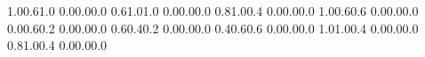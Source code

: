 \documentclass[a5paper,9pt]{scrreprt}
\begin{document}
\thispagestyle{empty}

\setslotsize{4.44cm}{0.203cm}
\settextframe{0.8mm}

\seteventcornerradius{0pt}


   {1.0}{0.6}{1.0}   {0.0}{0.0}{0.0}
  {0.6}{1.0}{1.0}   {0.0}{0.0}{0.0}
      {0.8}{1.0}{0.4}   {0.0}{0.0}{0.0}
 {1.0}{0.6}{0.6}   {0.0}{0.0}{0.0}
  {0.0}{0.6}{0.2}   {0.0}{0.0}{0.0}
  {0.6}{0.4}{0.2}   {0.0}{0.0}{0.0}
   {0.4}{0.6}{0.6}   {0.0}{0.0}{0.0}
  {1.0}{1.0}{0.4}   {0.0}{0.0}{0.0}
      {0.8}{1.0}{0.4}   {0.0}{0.0}{0.0}
\end{document}
